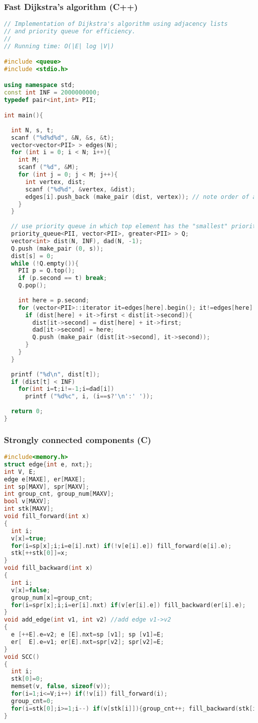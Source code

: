 \subsubsection{Fast Dijkstra's algorithm (C++)}
\begin{lstlisting}[language=C++]
// Implementation of Dijkstra's algorithm using adjacency lists
// and priority queue for efficiency.
//
// Running time: O(|E| log |V|)

#include <queue>
#include <stdio.h>

using namespace std;
const int INF = 2000000000;
typedef pair<int,int> PII;

int main(){
  
  int N, s, t;
  scanf ("%d%d%d", &N, &s, &t);
  vector<vector<PII> > edges(N);
  for (int i = 0; i < N; i++){
    int M;
    scanf ("%d", &M);
    for (int j = 0; j < M; j++){
      int vertex, dist;
      scanf ("%d%d", &vertex, &dist);
      edges[i].push_back (make_pair (dist, vertex)); // note order of arguments here
    }
  }
  
  // use priority queue in which top element has the "smallest" priority
  priority_queue<PII, vector<PII>, greater<PII> > Q;
  vector<int> dist(N, INF), dad(N, -1);
  Q.push (make_pair (0, s));
  dist[s] = 0;
  while (!Q.empty()){
    PII p = Q.top();
    if (p.second == t) break;
    Q.pop();
    
    int here = p.second;
    for (vector<PII>::iterator it=edges[here].begin(); it!=edges[here].end(); it++){
      if (dist[here] + it->first < dist[it->second]){
        dist[it->second] = dist[here] + it->first;
        dad[it->second] = here;
        Q.push (make_pair (dist[it->second], it->second));
      }
    }
  }
  
  printf ("%d\n", dist[t]);
  if (dist[t] < INF)
    for(int i=t;i!=-1;i=dad[i])
      printf ("%d%c", i, (i==s?'\n':' '));
    
  return 0;
}

\end{lstlisting}
\subsubsection{Strongly connected components (C)}
\begin{lstlisting}[language=C++]
#include<memory.h>
struct edge{int e, nxt;};
int V, E;
edge e[MAXE], er[MAXE];
int sp[MAXV], spr[MAXV];
int group_cnt, group_num[MAXV];
bool v[MAXV];
int stk[MAXV];
void fill_forward(int x)
{
  int i;
  v[x]=true;
  for(i=sp[x];i;i=e[i].nxt) if(!v[e[i].e]) fill_forward(e[i].e);
  stk[++stk[0]]=x;
}
void fill_backward(int x)
{
  int i;
  v[x]=false;
  group_num[x]=group_cnt;
  for(i=spr[x];i;i=er[i].nxt) if(v[er[i].e]) fill_backward(er[i].e);
}
void add_edge(int v1, int v2) //add edge v1->v2
{
  e [++E].e=v2; e [E].nxt=sp [v1]; sp [v1]=E;
  er[  E].e=v1; er[E].nxt=spr[v2]; spr[v2]=E;
}
void SCC()
{
  int i;
  stk[0]=0;
  memset(v, false, sizeof(v));
  for(i=1;i<=V;i++) if(!v[i]) fill_forward(i);
  group_cnt=0;
  for(i=stk[0];i>=1;i--) if(v[stk[i]]){group_cnt++; fill_backward(stk[i]);}
}
\end{lstlisting}
